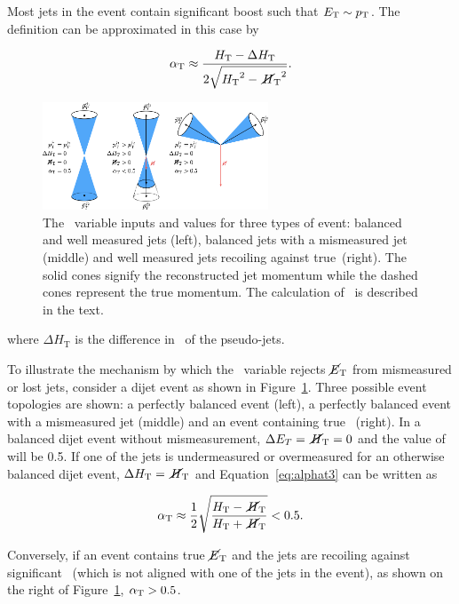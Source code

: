 Most jets in the event contain significant boost such that $E_{\textrm{T}} \sim {p_{\text T}}$. The \alphat 
definition can be approximated in this case by

\begin{equation}
  \label{eq:alphat3}
   \alpha_{\text{T}} \approx \frac{\mbox{$H_\text{T}$} - \Delta H_{\textrm{T}}}{2\sqrt{\mbox{$H_\text{T}$}^2 - \mbox{$\,\cancel{H}_{\rm T}$}^2}}.
\end{equation}

\begin{figure}
\centering
    \includegraphics[width=0.6\textwidth]{./Figures/alphat/alphat_cartoon}
  \caption{\label{fig:alphat_cartoon} The \alphat~variable inputs and values for three types of event: balanced and well measured jets (left), balanced jets with
  a mismeasured jet (middle) and well measured jets recoiling against true~\met (right). The solid cones signify the reconstructed jet momentum while the 
  dashed cones represent the true momentum. The calculation of \alphat~is described in the text.} 
\end{figure}
\noindent where $\Delta H_{\textrm{T}}$ is the difference in \pt~of the pseudo-jets.

To illustrate the mechanism by which the \alphat~variable rejects $\mbox{$\cancel{E}_\text{T}$}$ from mismeasured or lost jets,
consider a dijet event as shown in Figure~\ref{fig:alphat_cartoon}. Three possible event topologies are shown: 
a perfectly balanced event (left), a perfectly balanced event with a mismeasured jet (middle) and an event containing true \met~(right).
In a balanced dijet event without mismeasurement, $\Delta E_T = \mbox{$\,\cancel{H}_{\rm T}$} = 0$ and the 
value of \alphat will be 0.5. If one of the jets is undermeasured or overmeasured for an otherwise balanced dijet
event, $\Delta H_{\textrm{T}} = \mbox{$\,\cancel{H}_{\rm T}$}$ and Equation~\ref{eq:alphat3} can be written as 

\begin{equation}
  \label{eq:alphat4}
   \alpha_{\text{T}} \approx \frac{1}{2}\sqrt{\frac{\mbox{$H_\text{T}$} - \mbox{$\,\cancel{H}_{\rm T}$}}{\mbox{$H_\text{T}$} + \mbox{$\,\cancel{H}_{\rm T}$}}} < 0.5.
\end{equation}

Conversely, if an event contains true $\mbox{$\cancel{E}_\text{T}$}$ and the jets are recoiling against significant~\met 
(which is not aligned with one of the jets in the event), as shown on the right of 
Figure~\ref{fig:alphat_cartoon}, $\alpha_{\text{T}} > 0.5$. 

